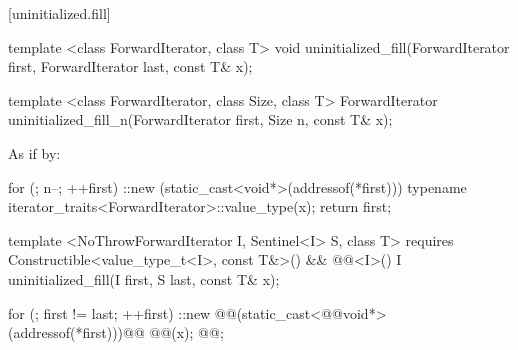 \pnum
{}

[uninitialized.fill]{}
{\color{remclr}
\begin{codeblock}
template <class ForwardIterator, class T>
  void uninitialized_fill(ForwardIterator first, ForwardIterator last,
                          const T& x);
\end{codeblock}

\begin{codeblock}
template <class ForwardIterator, class Size, class T>
  ForwardIterator uninitialized_fill_n(ForwardIterator first, Size n, const T& x);
\end{codeblock}

\setcounter{Paras}{1}
\pnum
\effects As if by:
\begin{codeblock}
        for (; n--; ++first)
          ::new (static_cast<void*>(addressof(*first)))
            typename iterator_traits<ForwardIterator>::value_type(x);
        return first;
\end{codeblock}
} %

{\color{addclr}
\begin{codeblock}
template <NoThrowForwardIterator I, Sentinel<I> S, class T>
  requires Constructible<value_type_t<I>, const T&>() &&
           @@<I>()
  I uninitialized_fill(I first, S last, const T& x);
\end{codeblock}
} %

\setcounter{Paras}{0}
\pnum
\effects {}
\begin{codeblock}
        for (; first != last; ++first)
          ::new @@(static_cast<@@void*>(addressof(*first)))@\added{)}@
            @@(x);
        @@;
\end{codeblock}

